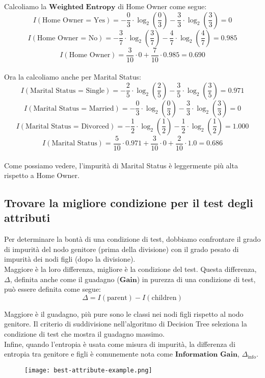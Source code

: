         Calcoliamo la $\textbf{Weighted Entropy}$ di Home Owner come segue:
            $$ I(\textrm{Home Owner = Yes}) = - \frac{0}{3} \cdot \log_{2}(\frac{0}{3}) - \frac{3}{3} \cdot \log_{2}(\frac{3}{3}) = 0 $$
            $$ I(\textrm{Home Owner = No}) = - \frac{3}{7} \cdot \log_{2}(\frac{3}{7}) - \frac{4}{7} \cdot \log_{2}(\frac{4}{7}) = 0.985 $$
            $$ I(\textrm{Home Owner}) = \frac{3}{10} \cdot 0 + \frac{7}{10} \cdot 0.985 = 0.690 $$
        \\[1\baselineskip]
        Ora la calcoliamo anche per Marital Status:
            $$ I(\textrm{Marital Status = Single}) = - \frac{2}{5} \cdot \log_{2}(\frac{2}{5}) - \frac{3}{5} \cdot \log_{2}(\frac{3}{5}) = 0.971 $$
            $$ I(\textrm{Marital Status = Married}) = - \frac{0}{3} \cdot \log_{2}(\frac{0}{3}) - \frac{3}{3} \cdot \log_{2}(\frac{3}{3}) = 0 $$
            $$ I(\textrm{Marital Status = Divorced}) = - \frac{1}{2} \cdot \log_{2}(\frac{1}{2}) - \frac{1}{2} \cdot \log_{2}(\frac{1}{2}) = 1.000 $$
            $$ I(\textrm{Marital Status}) = \frac{5}{10} \cdot 0.971 + \frac{3}{10} \cdot 0 + \frac{2}{10} \cdot 1.0 = 0.686 $$
            \\[1\baselineskip]
        Come possiamo vedere, l'impurità di Marital Status è leggermente più alta rispetto a Home Owner.

        \clearpage

        \subsection{Trovare la migliore condizione per il test degli attributi}
            Per determinare la bontà di una condizione di test, dobbiamo confrontare il grado di impurità del nodo genitore (prima della divisione) con il grado pesato di impurità dei nodi figli (dopo la divisione).
            \\
            Maggiore è la loro differenza, migliore è la condizione del test. Questa differenza, $\Delta$, definita anche come il guadagno ($\textbf{Gain}$) in purezza di una condizione di test, può essere definita come segue:
                $$ \Delta = I(\textrm{parent}) - I(\textrm{children}) $$

            Maggiore è il guadagno, più pure sono le classi nei nodi figli rispetto al nodo genitore. Il criterio di suddivisione nell'algoritmo di Decision Tree seleziona la condizione di test che mostra il guadagno massimo.
            \\[1\baselineskip]
            Infine, quando l'entropia è usata come misura di impurità, la differenza di entropia tra genitore e figli è comunemente nota come $\textbf{Information Gain}$, $\Delta_{\text{info}}$.

            \begin{figure}[h]
                \centering
                \texttt{[image: best-attribute-example.png]}
            \end{figure}

            \clearpage
